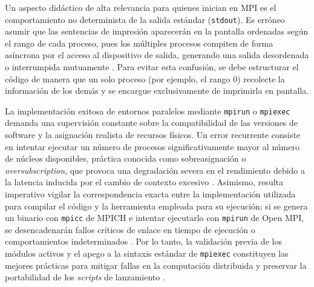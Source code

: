 Un aspecto didáctico de alta relevancia para quienes inician en MPI es el comportamiento no determinista de la salida estándar (\texttt{stdout}). Es erróneo asumir que las sentencias de impresión aparecerán en la pantalla ordenadas según el rango de cada proceso, pues los múltiples procesos compiten de forma asíncrona por el acceso al dispositivo de salida, generando una salida desordenada o interrumpida mutuamente \cite{pacheco_2011}. Para evitar esta confusión, se debe estructurar el código de manera que un solo proceso (por ejemplo, el rango 0) recolecte la información de los demás y se encargue exclusivamente de imprimirla en pantalla.

La implementación exitosa de entornos paralelos mediante \texttt{mpirun} o \texttt{mpiexec} demanda una supervisión constante sobre la compatibilidad de las versiones de software y la asignación realista de recursos físicos. Un error recurrente consiste en intentar ejecutar un número de procesos significativamente mayor al número de núcleos disponibles, práctica conocida como sobreasignación o \textit{oversubscription}, que provoca una degradación severa en el rendimiento debido a la latencia inducida por el cambio de contexto excesivo \cite{gropp_using_mpi_1999}. Asimismo, resulta imperativo vigilar la correspondencia exacta entre la implementación utilizada para compilar el código y la herramienta empleada para su ejecución; si se genera un binario con \texttt{mpicc} de MPICH e intentar ejecutarlo con \texttt{mpirun} de Open MPI, se desencadenarán fallos críticos de enlace en tiempo de ejecución o comportamientos indeterminados \cite{open_mpi_2026}. Por lo tanto, la validación previa de los módulos activos y el apego a la sintaxis estándar de \texttt{mpiexec} constituyen las mejores prácticas para mitigar fallas en la computación distribuida y preservar la portabilidad de los \textit{scripts} de lanzamiento \cite{pacheco_2011, mpi_forum_2025}.
